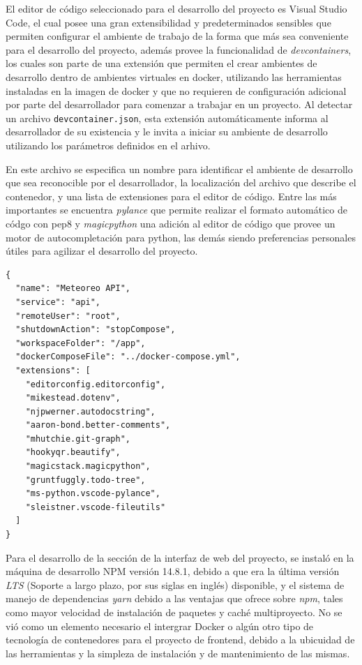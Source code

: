 El editor de código seleccionado para el desarrollo del proyecto es Visual Studio Code, el cual posee una gran extensibilidad y predeterminados sensibles que permiten configurar el ambiente de trabajo de la forma que más sea conveniente para el desarrollo del proyecto, además provee la funcionalidad de \textit{devcontainers}, los cuales son parte de una extensión que permiten el crear ambientes de desarrollo dentro de ambientes virtuales en docker, utilizando las herramientas instaladas en la imagen de docker y que no requieren de configuración adicional por parte del desarrollador para comenzar a trabajar en un proyecto. Al detectar un archivo \texttt{devcontainer.json}, esta extensión automáticamente informa al desarrollador de su existencia y le invita a iniciar su ambiente de desarrollo utilizando los parámetros definidos en el arhivo.

En este archivo se especifica un nombre para identificar el ambiente de desarrollo que sea reconocible por el desarrollador, la localización del archivo que describe el contenedor, y una lista de extensiones para el editor de código. Entre las más importantes se encuentra \emph{pylance} que permite  realizar el formato automático de códgo con pep8 y \emph{magicpython} una adición al editor de código que provee un motor de autocompletación para python, las demás siendo preferencias personales útiles para agilizar el desarrollo del proyecto.


\begin{verbatim}
{
  "name": "Meteoreo API",
  "service": "api",
  "remoteUser": "root",
  "shutdownAction": "stopCompose",
  "workspaceFolder": "/app",
  "dockerComposeFile": "../docker-compose.yml",
  "extensions": [
    "editorconfig.editorconfig",
    "mikestead.dotenv",
    "njpwerner.autodocstring",
    "aaron-bond.better-comments",
    "mhutchie.git-graph",
    "hookyqr.beautify",
    "magicstack.magicpython",
    "gruntfuggly.todo-tree",
    "ms-python.vscode-pylance",
    "sleistner.vscode-fileutils"
  ]
}
\end{verbatim}

Para el desarrollo de la sección de la interfaz de web del proyecto, se instaló en la máquina de desarrollo NPM versión 14.8.1, debido a que era la última versión \textit{LTS} (Soporte a largo plazo, por sus siglas en inglés) disponible, y el sistema de manejo de dependencias \textit{yarn} debido a las ventajas que ofrece sobre \textit{npm}, tales como mayor velocidad de instalación de paquetes y caché multiproyecto. No se vió como un elemento necesario el intergrar Docker o algún otro tipo de tecnología de contenedores para el proyecto de frontend, debido a la ubicuidad de las herramientas y la simpleza de instalación y de mantenimiento de las mismas.
